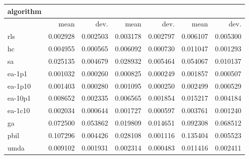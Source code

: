 \begin{tabular}{@{}l*{6}{>{{}}N{1}{2}}@{}}
\toprule
{algorithm} &  &  &  \\
\midrule
& {mean} & {dev.} & {mean} & {dev.} & {mean} & {dev.} \\
\midrule
rls & 0.002928 & 0.002503 & 0.003178 & 0.002797 & 0.006107 & 0.005300 \\
 hc & 0.004955 & 0.000565 & 0.006092 & 0.000730 & 0.011047 & 0.001293 \\
 sa & 0.025135 & 0.004679 & 0.028932 & 0.005464 & 0.054067 & 0.010137 \\
 ea-1p1 & 0.001032 & 0.000260 & 0.000825 & 0.000249 & 0.001857 & 0.000507 \\
 ea-1p10 & 0.001403 & 0.000280 & 0.001095 & 0.000250 & 0.002499 & 0.000529 \\
 ea-10p1 & 0.008652 & 0.002335 & 0.006565 & 0.001854 & 0.015217 & 0.004184 \\
 ea-1c10 & 0.002034 & 0.000644 & 0.001727 & 0.000597 & 0.003761 & 0.001240 \\
 ga & 0.072500 & 0.053862 & 0.019809 & 0.014651 & 0.092308 & 0.068512 \\
 pbil & 0.107296 & 0.004426 & 0.028108 & 0.001116 & 0.135404 & 0.005523 \\
 umda & 0.009102 & 0.001931 & 0.002314 & 0.000483 & 0.011416 & 0.002411 \\
 \bottomrule
\end{tabular}
